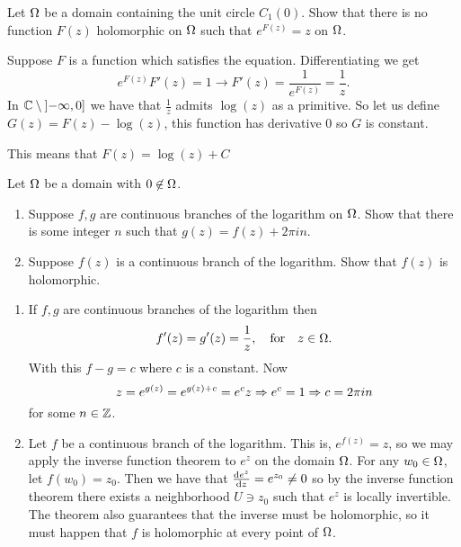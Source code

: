 \documentclass[12pt]{memoir}
\begin{document}
\begin{Ej}
    Let $\Omega$ be a domain containing the unit circle $C_1(0)$. Show that there is no function $F(z)$ holomorphic on $\Omega$ such that $e^{F(z)}=z$ on $\Omega$. 
\end{Ej}

\begin{ptcbr}
Suppose $F$ is a function which satisfies the equation. Differentiating we get 
$$e^{F(z)}F'(z)=1\to F'(z)=\frac{1}{e^{F(z)}}=\frac1z.$$
In $\mathbb{C}\setminus\left\rbrack-\infty,0\right\rbrack$ we have that $\frac{1}{z}$ admits $\log(z)$ as a primitive. So let us define $G(z)=F(z)-\log(z)$, this function has derivative $0$ so $G$ is constant.\par 
This means that $F(z)=\log(z)+C$
\end{ptcbr}

\begin{Ej}
    Let $\Omega$ be a domain with $0\not\in\Omega$.
    \begin{enumerate}
        \itemsep=-0.4em
        \item Suppose $f,g$ are continuous branches of the logarithm on $\Omega$. Show that there is some integer $n$ such that $g(z)=f(z)+2\pi i n$. 
        \item Suppose $f(z)$ is a continuous branch of the logarithm. Show that $f(z)$ is holomorphic. 
    \end{enumerate}
\end{Ej}

\begin{ptcbr}
    \begin{enumerate}
        \itemsep=-0.4em
        \item If $f,g$ are continuous branches of the logarithm then 
        $$f'(z)=g'(z)=\frac{1}{z},\quad\text{for}\quad z\in\Omega.$$
        With this $f-g=c$ where $c$ is a constant. Now 
        $$z=e^{g(z)}=e^{g(z)+c}=e^c z\Rightarrow e^c=1\Rightarrow c=2\pi i n$$
        for some $n\in\mathbb{Z}$. 
        \item Let $f$ be a continuous branch of the logarithm. This is, $e^{f(z)}=z$, so we may apply the inverse function theorem to $e^z$ on the domain $\Omega$.
        For any $w_0\in\Omega$, let $f(w_0)=z_0$. Then we have that $\dv{e^z}{z}(z_0)=e^{z_0}\neq 0$ so by the inverse function theorem there exists a neighborhood $U\ni z_0$ such that $e^z$ is locally invertible. The theorem also guarantees that the inverse must be holomorphic, so it must happen that $f$ is holomorphic at every point of $\Omega$. 
    \end{enumerate}
\end{ptcbr}
\end{document}
